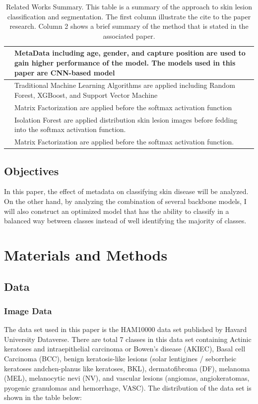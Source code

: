 \documentclass[sensors,article,submit,pdftex,moreauthors]{Definitions/mdpi}
\begin{document}
\begin{table}[ht]
\begin{tabular}{|p{1cm}|p{12.5cm}|}
		\hline
		\cite{03910} & MetaData including age, gender, and capture position are used to gain higher performance of the model. The models used in this paper are CNN-based model \\
		\hline
		\cite{03798} & Traditional Machine Learning Algorithms are applied including Random Forest, XGBoost, and Support Vector Machine \\
		\hline
		\cite{10348} & Matrix Factorization are applied before the softmax activation function \\
		\hline
		\cite{05045} & Isolation Forest are applied distribution skin lesion images before fedding into the softmax activation function. \\
		\hline
		\cite{10348} & Matrix Factorization are applied before the softmax activation function. \\
		\hline
	\end{tabular}
	\caption{Related Works Summary. This table is a summary of the approach to skin lesion classification and segmentation. The first column illustrate the cite to the paper research. Column 2 shows a brief summary of the method that is stated in the associated paper.}
	\label{table:related-work-summary}
\end{table}
\FloatBarrier
\subsection{Objectives}
In this paper, the effect of metadata on classifying skin disease will be analyzed. On the other hand, by analyzing the combination of several backbone models, I will also construct an optimized model that has the ability to classify in a balanced way between classes instead of well identifying the majority of classes.
\section{Materials and Methods}
\subsection{Data}
\subsubsection{Image Data}
The data set used in this paper is the HAM10000 data set published by Havard University Dataverse\cite{10417}. There are total 7 classes in this data set containing Actinic keratoses and intraepithelial carcinoma or Bowen's disease (AKIEC), Basal cell Carcinoma (BCC),  benign keratosis-like lesions (solar lentigines / seborrheic keratoses andchen-planus like keratoses, BKL), dermatofibroma (DF), melanoma (MEL), melanocytic nevi (NV), and vascular lesions (angiomas, angiokeratomas, pyogenic granulomas and hemorrhage, VASC). The distribution of the data set is shown in the table below:
\end{document}

